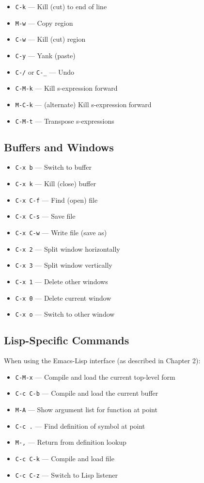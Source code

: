\begin{itemize}
\item \texttt{C-k} --- Kill (cut) to end of line
\item \texttt{M-w} --- Copy region
\item \texttt{C-w} --- Kill (cut) region
\item \texttt{C-y} --- Yank (paste)
\item \texttt{C-/} or \texttt{C-\_} --- Undo
\item \texttt{C-M-k} --- Kill s-expression forward
\item \texttt{M-C-k} --- (alternate) Kill s-expression forward
\item \texttt{C-M-t} --- Transpose s-expressions
\end{itemize}

\subsection{Buffers and Windows}

\begin{itemize}
\item \texttt{C-x b} --- Switch to buffer
\item \texttt{C-x k} --- Kill (close) buffer
\item \texttt{C-x C-f} --- Find (open) file
\item \texttt{C-x C-s} --- Save file
\item \texttt{C-x C-w} --- Write file (save as)
\item \texttt{C-x 2} --- Split window horizontally
\item \texttt{C-x 3} --- Split window vertically
\item \texttt{C-x 1} --- Delete other windows
\item \texttt{C-x 0} --- Delete current window
\item \texttt{C-x o} --- Switch to other window
\end{itemize}

\subsection{Lisp-Specific Commands}

When using the Emacs-Lisp interface (as described in Chapter 2):

\begin{itemize}
\item \texttt{C-M-x} --- Compile and load the current top-level form
\item \texttt{C-c C-b} --- Compile and load the current buffer
\item \texttt{M-A} --- Show argument list for function at point
\item \texttt{C-c .} --- Find definition of symbol at point
\item \texttt{M-,} --- Return from definition lookup
\item \texttt{C-c C-k} --- Compile and load file
\item \texttt{C-c C-z} --- Switch to Lisp listener
\end{itemize}

